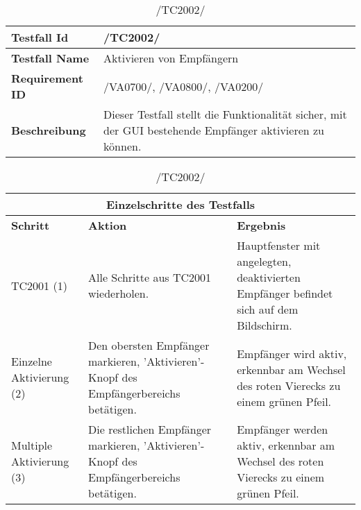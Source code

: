\begin{table}[h]
\caption{/TC2002/}
\label{tab:TC2002}
\begin{center}
\begin{tabular}{|p{3.5cm}|p{12cm}|}
\hline
\textbf{Testfall Id} & /TC2002/\\
\hline
\textbf{Testfall Name} & Aktivieren von Empfängern\\
\hline
\textbf{Requirement ID} & /VA0700/, /VA0800/, /VA0200/\\
\hline
\textbf{Beschreibung} & Dieser Testfall stellt die Funktionalität sicher, mit
der GUI bestehende Empfänger aktivieren zu können.\\
\hline
\end{tabular}
\begin{tabular}{|p{2.5cm}|p{5cm}|p{7.55cm}|}
\multicolumn{3}{|c|}{\textbf{Einzelschritte des Testfalls}} \\
\hline
\textbf{Schritt} & \textbf{Aktion} & \textbf{Ergebnis}\\
\hline
TC2001 (1)& Alle Schritte aus TC2001 wiederholen. & Hauptfenster mit angelegten,
deaktivierten Empfänger befindet sich auf dem Bildschirm.\\
\hline
Einzelne Aktivierung (2) & Den obersten Empfänger markieren, 'Aktivieren'-Knopf
des Empfängerbereichs betätigen. & Empfänger wird aktiv, erkennbar am
Wechsel des roten Vierecks zu einem grünen Pfeil.\\
\hline
Multiple Aktivierung (3) & Die restlichen Empfänger markieren,
'Aktivieren'-Knopf des Empfängerbereichs betätigen. & Empfänger werden aktiv,
erkennbar am Wechsel des roten Vierecks zu einem grünen Pfeil.\\
\hline
\end{tabular}
\end{center}
\label{default}
\end{table}

